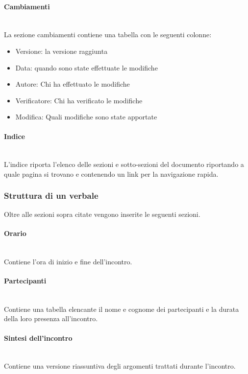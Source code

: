 \documentclass{article}
\begin{document}
\paragraph{Cambiamenti}~\\
La sezione cambiamenti contiene una tabella con le seguenti colonne:
\begin{itemize}
    \item Versione: la versione raggiunta
    \item Data: quando sono state effettuate le modifiche
    \item Autore: Chi ha effettuato le modifiche
    \item Verificatore: Chi ha verificato le modifiche
    \item Modifica: Quali modifiche sono state apportate
\end{itemize}

\paragraph{Indice}~\\
L'indice riporta l'elenco delle sezioni e sotto-sezioni del documento riportando a quale pagina si trovano e contenendo un link per la navigazione rapida.

\subsubsection{Struttura di un verbale}
Oltre alle sezioni sopra citate vengono inserite le seguenti sezioni.

\paragraph{Orario}~\\
Contiene l'ora di inizio e fine dell'incontro.

\paragraph{Partecipanti}~\\
Contiene una tabella elencante il nome e cognome dei partecipanti e la durata della loro presenza all'incontro.

\paragraph{Sintesi dell'incontro}~\\
Contiene una versione riassuntiva degli argomenti trattati durante l'incontro.
\end{document}
